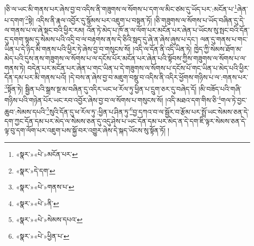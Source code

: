 །ཅི་ལ་ཡང་མི་གནས་པར་ཞེས་བྱ་བ་འདིས་ནི་གཟུགས་ལ་སོགས་པ་དག་ལ་མིང་ཙམ་དུ་ཡོད་པར་:མངོན་པ་\footnote{«སྣར་»«པེ་»མངོན་པར་}ཞེན་པ་དགག་\footnote{«སྣར་»དེ་དག་}སྟེ། འདིས་ནི་རྣལ་འབྱོར་དུ་སྙོམས་པར་འཇུག་པ་བསྟན་ཏོ། །ཅི་གཟུགས་ལ་སོགས་པ་ཡོད་བཞིན་དུ་དེ་ལ་གནས་པ་ལ་ཞེ་སྡང་བའི་ཕྱིར་རམ། འོན་ཏེ་མེད་པ་ཁོ་ན་ལ་ལོག་པར་མངོན་པར་ཞེན་པ་ཡོངས་སུ་སྤང་བའི་དོན་དུ་དགག་སྙམ་དུ་སེམས་པའི་འདྲི་བ་ལ་བརྟགས་ནས་དེ་ཅིའི་སླད་དུ་ཞེ་ན་ཞེས་ཞུས་པ་དང་། ལན་དུ་གནས་པ་གང་ཡིན་པ་དེ་ཉིད་མི་གནས་པའི་ཕྱིར་ཏེ་ཞེས་བྱ་བ་གསུངས་སོ། །འདི་ལ་དོན་ནི་འདི་ཡིན་ཏེ། ཁྱེད་ཀྱི་སེམས་ཐོག་མ་མེད་པའི་དུས་ནས་གཟུགས་ལ་སོགས་པ་ལ་དངོས་པོར་མངོན་པར་ཞེན་པའི་སྟོབས་ཀྱིས་གཟུགས་ལ་སོགས་པ་ལ་གནས་ཏེ། བདེན་པར་མངོན་པར་ཞེན་པ་གང་ཡིན་པ་དེ་གཟུགས་ལ་སོགས་པ་དངོས་པོ་གང་ཡིན་པ་མེད་པའི་ཕྱིར་དོན་དམ་པར་མི་གནས་པའོ། །དེ་བས་ན་ཞེས་བྱ་བ་མཇུག་བསྡུ་བ་འདིས་ནི་འདིར་ཕྱོགས་གཉིས་པ་ལ་:གནས་པར་\footnote{«སྣར་»«པེ་»གནས་པ་}སྟོན་ཏེ། སྦྱིན་པའི་སྒྲས་སྔ་མ་བཞིན་དུ་འདིར་ཡང་ཕ་རོལ་ཏུ་ཕྱིན་པ་དྲུག་ཅར་དུ་བཞེད་དོ། །མི་བཟོད་པའི་གཞི་གཉིས་པའི་གཉེན་པོར་ཡང་རབ་འབྱོར་ཞེས་བྱ་བ་ལ་སོགས་པ་གསུངས་སོ། །འདི་མཐའ་དག་གིས་ཅི་\footnote{«སྣར་»«པེ་»ནི་}གལ་ཏེ་བྱང་ཆུབ་:སེམས་དཔའི་\footnote{«སྣར་»«པེ་»སེམས་དཔའ་}སུའི་དོན་དུ་ཕ་རོལ་ཏུ་:ཕྱིན་པ་ཤིན་ཏུ་\footnote{«སྣར་»«པེ་»ཕྱིན་པ་}བྱ་དཀའ་བ་ལ་སྦྱོར་བ་རྩོམ་པར་སྤྲོ་ཡང་སེམས་ཅན་དེ་དག་ཀྱང་དོན་དམ་པར་མེད་ལ་སེམས་ཅན་དུ་འདུ་ཤེས་པ་ཡང་དོན་དམ་པར་མེད་ན་དེ་དག་ཇི་ལྟར་སེམས་ཅན་དེ་ལྟ་བུ་དག་ལོག་པར་འཇུག་པས་སྐྱོ་བར་འགྱུར་ཞེས་དེ་སྐད་ཡོངས་སུ་སྟོན་ཏོ། །
